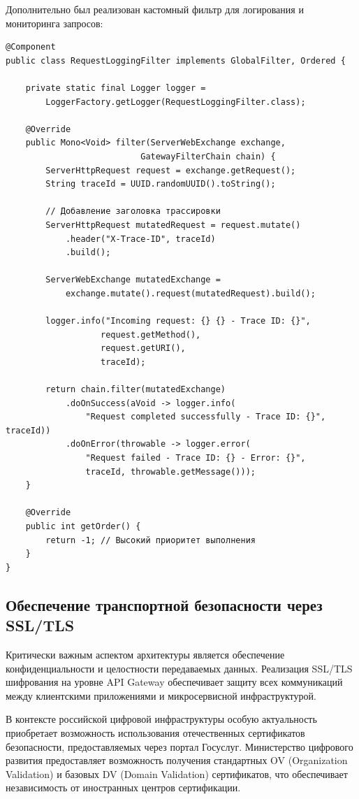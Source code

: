 Дополнительно был реализован кастомный фильтр для логирования и мониторинга запросов:

\begin{lstlisting}
@Component
public class RequestLoggingFilter implements GlobalFilter, Ordered {

    private static final Logger logger =
        LoggerFactory.getLogger(RequestLoggingFilter.class);

    @Override
    public Mono<Void> filter(ServerWebExchange exchange,
                           GatewayFilterChain chain) {
        ServerHttpRequest request = exchange.getRequest();
        String traceId = UUID.randomUUID().toString();

        // Добавление заголовка трассировки
        ServerHttpRequest mutatedRequest = request.mutate()
            .header("X-Trace-ID", traceId)
            .build();

        ServerWebExchange mutatedExchange =
            exchange.mutate().request(mutatedRequest).build();

        logger.info("Incoming request: {} {} - Trace ID: {}",
                   request.getMethod(),
                   request.getURI(),
                   traceId);

        return chain.filter(mutatedExchange)
            .doOnSuccess(aVoid -> logger.info(
                "Request completed successfully - Trace ID: {}", traceId))
            .doOnError(throwable -> logger.error(
                "Request failed - Trace ID: {} - Error: {}",
                traceId, throwable.getMessage()));
    }

    @Override
    public int getOrder() {
        return -1; // Высокий приоритет выполнения
    }
}
\end{lstlisting}

\subsection{Обеспечение транспортной безопасности через SSL/TLS}

Критически важным аспектом архитектуры является обеспечение конфиденциальности и целостности передаваемых данных. Реализация SSL/TLS шифрования на уровне API Gateway обеспечивает защиту всех коммуникаций между клиентскими приложениями и микросервисной инфраструктурой.

{В контексте российской цифровой инфраструктуры особую актуальность приобретает возможность использования отечественных сертификатов безопасности, предоставляемых через портал Госуслуг}. Министерство цифрового развития предоставляет возможность получения стандартных OV (Organization Validation) и базовых DV (Domain Validation) сертификатов, что обеспечивает независимость от иностранных центров сертификации.

